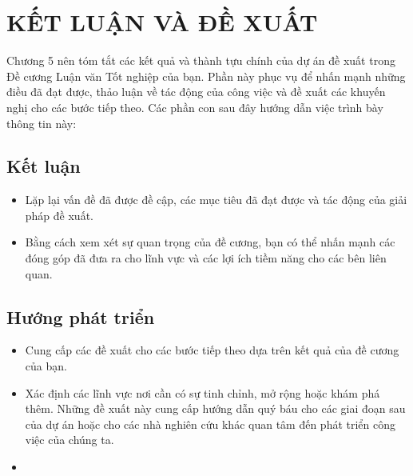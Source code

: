 \chapter{KẾT LUẬN VÀ ĐỀ XUẤT}

Chương 5 nên tóm tắt các kết quả và thành tựu chính của dự án đề xuất trong Đề cương Luận văn Tốt nghiệp của bạn. Phần này phục vụ để nhấn mạnh những điều đã đạt được, thảo luận về tác động của công việc và đề xuất các khuyến nghị cho các bước tiếp theo. Các phần con sau đây hướng dẫn việc trình bày thông tin này:

\section{Kết luận}
\begin{itemize}
\item Lặp lại vấn đề đã được đề cập, các mục tiêu đã đạt được và tác động của giải pháp đề xuất.
\item Bằng cách xem xét sự quan trọng của đề cương, bạn có thể nhấn mạnh các đóng góp đã đưa ra cho lĩnh vực và các lợi ích tiềm năng cho các bên liên quan.
\end{itemize}

\section{Hướng phát triển}
\begin{itemize}
\item Cung cấp các đề xuất cho các bước tiếp theo dựa trên kết quả của đề cương của bạn.
\item Xác định các lĩnh vực nơi cần có sự tinh chỉnh, mở rộng hoặc khám phá thêm. Những đề xuất này cung cấp hướng dẫn quý báu cho các giai đoạn sau của dự án hoặc cho các nhà nghiên cứu khác quan tâm đến phát triển công việc của chúng ta.
\item \end{itemize}